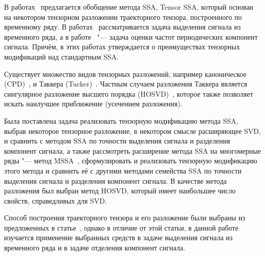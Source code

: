 \documentclass[specialist,
    substylefile = spbu.rtx,
    subf,href,colorlinks=true, 12pt]{disser}
\theoremstyle{plain}
\theoremstyle{definition}
\theoremstyle{remark}
\begin{document}
    В работах~\cite{TSSA, TSSA-improved, hosvd-hooi-separation} предлагается обобщение метода SSA, Tensor SSA, который основан на некотором
    тензорном разложении траекторного тензора, построенного по временному ряду.
    В работах~\cite{TSSA, TSSA-improved} рассматривается задача выделения сигнала из временного ряда,
    а в работе~\cite{hosvd-hooi-separation} "--- задача оценки частот периодических компонент сигнала.
    Причём, в этих работах утверждается о преимуществах тензорных модификаций над стандартным SSA\@.

    Существует множество видов тензорных разложений, например каноническое (CPD)~\cite{parafac1, parafac2},
    и Таккера (Tucker)~\cite{tucker}. Частным случаем разложения Таккера является сингулярное
    разложение высшего порядка (HOSVD)~\cite{hosvd}, которое также позволяет искать наилучшее приближение 
    (усечением разложения).
    

    Была поставлена задача реализовать тензорную модификацию
    метода SSA, выбрав некоторое тензорное разложение, в некотором смысле расширяющее SVD,
    и сравнить с методом SSA по точности выделения сигнала и разделения компонент сигнала, а также
    рассмотреть расширение метода SSA на многомерные ряды "--- метод MSSA~\cite{ssa-2020},
    сформулировать и реализовать тензорную модификацию этого метода и сравнить её с другими методами
    семейства SSA по точности выделения сигнала и разделения компонент сигнала.
    В качестве метода разложения был выбран метод HOSVD, который имеет наибольшее число
    свойств, справедливых для SVD.

    Способ построения траекторного тензора и его разложение были выбраны из предложенных в
    статье~\cite{hosvd-hooi-separation}, однако в отличие от этой статьи, в данной работе изучается применение
    выбранных средств в задаче выделения сигнала из временного ряда и в задаче отделения компонент сигнала.
\end{document}
